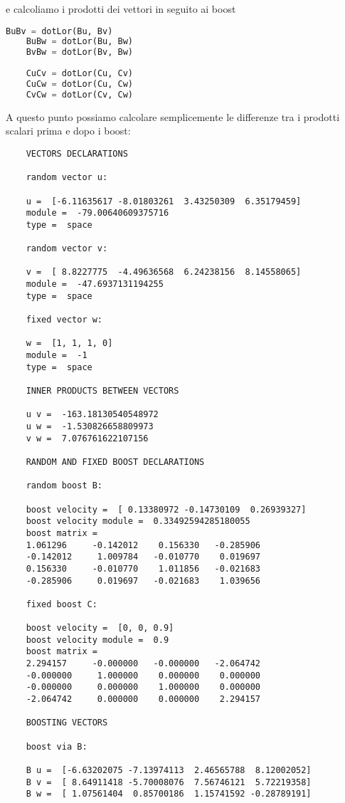 \documentclass[12pt,notitlepage]{report}
\begin{document}
e calcoliamo i prodotti dei vettori in seguito ai boost

\begin{lstlisting}[language=Python]
	BuBv = dotLor(Bu, Bv)
	BuBw = dotLor(Bu, Bw)
	BvBw = dotLor(Bv, Bw)
	
	CuCv = dotLor(Cu, Cv)
	CuCw = dotLor(Cu, Cw)
	CvCw = dotLor(Cv, Cw)
\end{lstlisting}

A questo punto possiamo calcolare semplicemente le differenze tra i prodotti scalari prima e dopo i boost:

\begin{verbatim}
	VECTORS DECLARATIONS
	
	random vector u:
	
	u =  [-6.11635617 -8.01803261  3.43250309  6.35179459] 
	module =  -79.00640609375716 
	type =  space
	
	random vector v:
	
	v =  [ 8.8227775  -4.49636568  6.24238156  8.14558065] 
	module =  -47.6937131194255 
	type =  space
	
	fixed vector w:
	
	w =  [1, 1, 1, 0] 
	module =  -1 
	type =  space
	
	INNER PRODUCTS BETWEEN VECTORS
	
	u v =  -163.18130540548972
	u w =  -1.530826658809973
	v w =  7.076761622107156
	
	RANDOM AND FIXED BOOST DECLARATIONS
	
	random boost B:
	
	boost velocity =  [ 0.13380972 -0.14730109  0.26939327] 
	boost velocity module =  0.33492594285180055
	boost matrix =
	1.061296	 -0.142012	  0.156330	 -0.285906	
	-0.142012	  1.009784	 -0.010770	  0.019697	
	0.156330	 -0.010770	  1.011856	 -0.021683	
	-0.285906	  0.019697	 -0.021683	  1.039656	
	
	fixed boost C:
	
	boost velocity =  [0, 0, 0.9] 
	boost velocity module =  0.9
	boost matrix =
	2.294157	 -0.000000	 -0.000000	 -2.064742	
	-0.000000	  1.000000	  0.000000	  0.000000	
	-0.000000	  0.000000	  1.000000	  0.000000	
	-2.064742	  0.000000	  0.000000	  2.294157	
	
	BOOSTING VECTORS
	
	boost via B:
	
	B u =  [-6.63202075 -7.13974113  2.46565788  8.12002052]
	B v =  [ 8.64911418 -5.70008076  7.56746121  5.72219358]
	B w =  [ 1.07561404  0.85700186  1.15741592 -0.28789191]
	

\end{verbatim}
\end{document}
